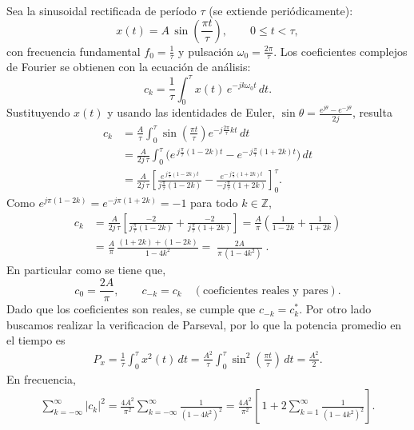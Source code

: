 \documentclass[
  11pt,
  letterpaper,
   addpoints,
   answers
  ]{exam}
\begin{document}
\begin{questions}
\begin{solution}
Sea la sinusoidal rectificada de período \(\tau\) (se extiende periódicamente):
\begin{equation}
x(t)=A\,\sin\!\left(\frac{\pi t}{\tau}\right),\qquad 0\le t<\tau,
\end{equation}
con frecuencia fundamental \(f_0=\tfrac{1}{\tau}\) y pulsación \(\omega_0=\tfrac{2\pi}{\tau}\).
Los coeficientes complejos de Fourier se obtienen con la ecuación de análisis:
\begin{equation}
c_k=\frac{1}{\tau}\int_{0}^{\tau} x(t)\,e^{-jk\omega_0 t}\,dt.
\end{equation}
Sustituyendo \(x(t)\) y usando las identidades de Euler,
\(\sin\theta=\tfrac{e^{j\theta}-e^{-j\theta}}{2j}\), resulta
\begin{align}
c_k
&=\frac{A}{\tau}\int_{0}^{\tau}\sin\!\left(\frac{\pi t}{\tau}\right)e^{-j\frac{2\pi}{\tau}kt}\,dt\\
&=\frac{A}{2j\,\tau}\int_{0}^{\tau}\Big(e^{\,j\frac{\pi}{\tau}(1-2k)t}-e^{-\,j\frac{\pi}{\tau}(1+2k)t}\Big)\,dt\\
&=\frac{A}{2j\,\tau}\left[
\frac{e^{\,j\frac{\pi}{\tau}(1-2k)t}}{j\frac{\pi}{\tau}(1-2k)}
-\frac{e^{-\,j\frac{\pi}{\tau}(1+2k)t}}{-j\frac{\pi}{\tau}(1+2k)}
\right]_{0}^{\tau}.
\end{align}
Como \(e^{j\pi(1-2k)}=e^{-j\pi(1+2k)}=-1\) para todo \(k\in\mathbb{Z}\),
\begin{align}
c_k
&=\frac{A}{2j\,\tau}\left[
\frac{-2}{j\frac{\pi}{\tau}(1-2k)}+\frac{-2}{j\frac{\pi}{\tau}(1+2k)}
\right]
=\frac{A}{\pi}\left(\frac{1}{1-2k}+\frac{1}{1+2k}\right)\\
&=\frac{A}{\pi}\,\frac{(1+2k)+(1-2k)}{1-4k^2}
=\boxed{\;\frac{2A}{\pi\,(1-4k^2)}\;}.
\end{align}
En particular como se tiene que,
\begin{equation}
c_0=\frac{2A}{\pi},\qquad c_{-k}=c_k\quad(\text{coeficientes reales y pares}).
\end{equation}
Dado que los coeficientes son reales, se cumple que \(c_{-k} = c_k^*\). Por otro lado buscamos realizar la verificacion de Parseval, por lo que la potencia promedio en el tiempo es
\begin{align}
P_x
=\frac{1}{\tau}\int_{0}^{\tau}x^2(t)\,dt
=\frac{A^2}{\tau}\int_{0}^{\tau}\sin^2\!\left(\frac{\pi t}{\tau}\right)\,dt
=\frac{A^2}{2}.
\end{align}
En frecuencia,
\begin{align}
\sum_{k=-\infty}^{\infty}|c_k|^2
=\frac{4A^2}{\pi^2}\sum_{k=-\infty}^{\infty}\frac{1}{(1-4k^2)^2}
=\frac{4A^2}{\pi^2}\!\left[\,1+2\sum_{k=1}^{\infty}\frac{1}{(1-4k^2)^2}\right].

\end{align}
\end{solution}
\end{questions}
\end{document}
